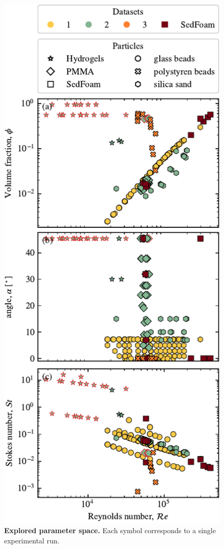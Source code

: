\documentclass[twocolumn]{article}
\begin{document}
\begin{figure}
	\centering
	\includegraphics{figure2.pdf}
	\caption{\textbf{Explored parameter space.} Each symbol corresponds to a single experimental run.}
	\label{fig:fig2}
\end{figure}
\end{document}
